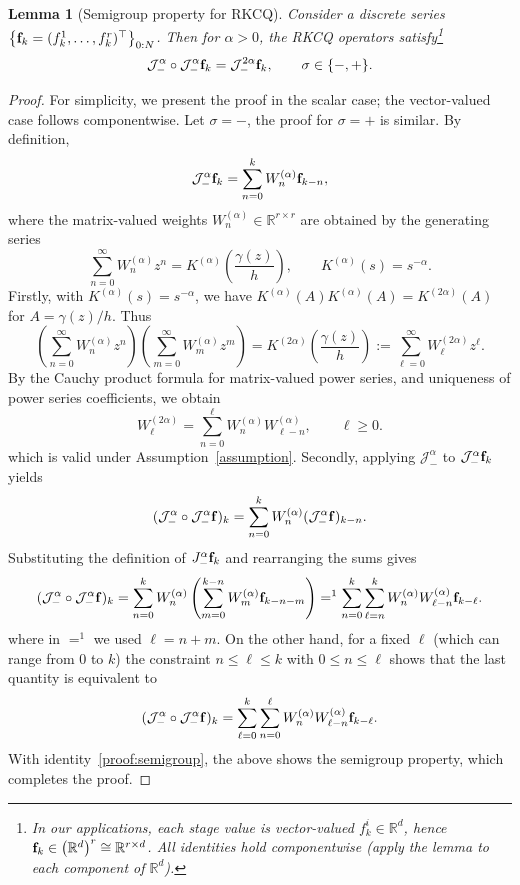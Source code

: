 \documentclass[a4paper,10pt,reqno]{amsart}
\newtheorem{lemma}{Lemma}[section]
\theoremstyle{definition}
\newcommand{\R}{\mathbb{R}}      %
\begin{document}
\begin{lemma}[Semigroup property for RKCQ]\label{lemma:Semi_group}
Consider a discrete series $\left\{ {\bf f}_k=(f_k^1,\ldots,f_k^r)^\top\right\}_{0:N}$. Then for $\alpha>0$, the RKCQ operators satisfy\footnote{\color{blue}In our applications, each stage value is vector-valued 
$f_k^i\in \R^d$, hence ${\bf f}_k\in \big(\R^d\big)^r\cong \R^{r\times d}$. All identities hold componentwise (apply the lemma to each component of $\R^d$).}
\[
\mathcal J_-^\alpha \circ \mathcal J_-^\alpha  {\bf f}_k
=
\mathcal J_-^{2\alpha} {\bf f}_k,\qquad \sigma\in \{-,+\}.
\]
\end{lemma}
\begin{proof}
For simplicity, we present the proof in the scalar case; the vector-valued case follows componentwise. Let  $\sigma=-$, the proof for $\sigma=+$ is similar. By definition,
\[
\mathcal J_-^\alpha {\bf f}_k
=
\sum_{n=0}^{k} W_n^{(\alpha)} {\bf f}_{k-n},
\]
where the matrix-valued weights $W_n^{(\alpha)} \in \mathbb{R}^{r\times r}$ are obtained by the generating series
\[
\sum_{n=0}^{\infty}
W_n^{(\alpha)} z^n
=
K^{(\alpha)}\!\left(\frac{\gamma(z)}{h}\right),
\qquad
K^{(\alpha)}(s)=s^{-\alpha}.
\]
Firstly, with $K^{(\alpha)}(s)=s^{-\alpha}$, we have
$
K^{(\alpha)}(A)K^{(\alpha)}(A)
=
K^{(2\alpha)}(A)$ for 
$A=\gamma(z)/h$. Thus
\[
\left(
\sum_{n=0}^{\infty}
W_n^{(\alpha)} z^n
\right)\left(
\sum_{m=0}^{\infty}
W_m^{(\alpha)} z^m
\right)
=
K^{(2\alpha)}\!\left(\frac{\gamma(z)}{h}\right):=\sum_{\ell=0}^{\infty}
W_\ell^{(2\alpha)} z^\ell.
\]
By the Cauchy product formula for matrix-valued power series, and uniqueness of power series coefficients, we obtain
\begin{equation}\label{proof:semigroup}
     W_\ell^{(2\alpha)}
=\sum_{n =0}^{\ell}W_{n}^{(\alpha)} W_{\ell-n }^{(\alpha)},\qquad \ell \geq 0.
\end{equation}
which is valid under Assumption~\ref{assumption}. Secondly, applying $\mathcal J_-^\alpha$ to $\mathcal J_-^\alpha {\bf f}_k$ yields
\[
(\mathcal J_-^\alpha\circ \mathcal J_-^\alpha {\bf f})_k
=
\sum_{n=0}^{k}
W_n^{(\alpha)}
(\mathcal J_-^\alpha {\bf f})_{k-n}.
\]
Substituting the definition of $J_-^\alpha {\bf f}_k$ and rearranging the sums gives
\begin{align*}
(\mathcal J_-^\alpha \circ\mathcal J_-^\alpha {\bf f})_k
=
\sum_{n=0}^{k}
W_n^{(\alpha)}
\left(
\sum_{m =0}^{k-n}
W_m ^{(\alpha)} 
{\bf f}_{k-n-m}
\right)  
=^{1}\sum_{n=0}^{k}
\sum_{\ell=n}^{k} W_{n}^{(\alpha)} W_{\ell-n}^{(\alpha)} {\bf f}_{k-\ell}.
\end{align*}
where in $=^1$ we used $\ell=n+m$. On the other hand, for a fixed $\ell$ (which can range from $0$ to  $k$) the constraint  $n\leq \ell\leq k$ with  $0\leq n\leq \ell$ shows that the last quantity is equivalent to
\begin{align*}
(\mathcal J_-^\alpha \circ\mathcal J_-^\alpha {\bf f})_k=
\sum_{\ell=0}^{k} \sum_{n=0}^{\ell}W_{n}^{(\alpha)} W_{\ell-n}^{(\alpha)} {\bf f}_{k-\ell}.
\end{align*}
With identity~\eqref{proof:semigroup}, the above shows the semigroup property, which completes the proof.
\end{proof}
\end{document}
